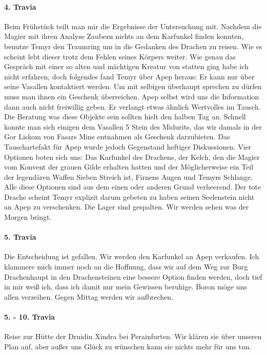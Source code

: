 \paragraph{4. Travia}
Beim Frühstück teilt man mir die Ergebnisse der Untersuchung mit. Nachdem die Magier mit ihren Analyse Zaubern nichts an dem Karfunkel finden konnten, benutze Temyr den Traumring um in die Gedanken des Drachen zu reisen. Wie es scheint lebt dieser trotz dem Fehlen seines Körpers weiter. Wie genau das Gespräch mit einer so alten und mächtigen Kreatur von statten ging habe ich nicht erfahren, doch folgendes fand Temyr über Apep heraus: Er kann nur über seine Vasallen kontaktiert werden. Um mit selbigen überhaupt sprechen zu dürfen muss man ihnen ein Geschenk überreichen. Apep selbst wird uns die Information dann auch nicht freiwillig geben. Er verlangt etwas ähnlich Wertvolles im Tausch. Die Beratung was diese Objekte sein sollten hielt den halben Tag an. Schnell konnte man sich einigen dem Vasallen 5 Stein des Midurits, das wir damals in der Gor Liskom von Fasars Mine entnahmen als Geschenk darzubieten. Das Tauschartefakt für Apep wurde jedoch Gegenstand heftiger Diskussionen. Vier Optionen boten sich uns: Das Karfunkel des Drachens, der Kelch, den die Magier vom Konvent der grauen Gilde erhalten hatten und der Möglicherweise ein Teil der legendären Waffen Sieben Streich ist, Firnens Augen und Temyrs Schlange. Alle diese Optionen sind aus dem einen oder anderen Grund verheerend. Der tote Drache scheint Temyr explizit darum gebeten zu haben seinen Seelenstein nicht an Apep zu verschenken. Die Lager sind gespalten. Wir werden sehen was der Morgen bringt.

\paragraph{5. Travia}
Die Entscheidung ist gefallen. Wir werden den Karfunkel an Apep verkaufen. Ich klammere mich immer noch an die Hoffnung, dass wir auf dem Weg zur Burg Drachenhaupt in den Drachensteinen eine bessere Option finden werden, doch tief in mir weiß ich, dass ich damit nur mein Gewissen beruhige. Boron möge uns allen verzeihen. Gegen Mittag werden wir aufbrechen.

\paragraph{5. - 10. Travia}
Reise zur Hütte der Druidin Xindra bei Perainfurten. Wir klären sie über unseren Plan auf, aber außer uns Glück zu wünschen kann sie nichts mehr für uns tun.

